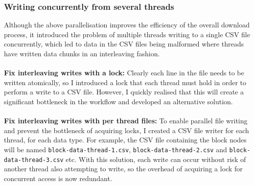 \subsubsection{Writing concurrently from several threads}
Although the above parallelisation improves the efficiency of the overall download process, it introduced the problem of multiple threads writing to a single CSV file concurrently, which led to data in the CSV files being malformed where threads have written data chunks in an interleaving fashion. 
\\\\
\textbf{Fix interleaving writes with a lock:} Clearly each line in the file needs to be written atomically, so I introduced a lock that each thread must hold in order to perform a write to a CSV file. However, I quickly realised that this will create a significant bottleneck in the workflow and developed an alternative solution.
\\\\
\textbf{Fix interleaving writes with per thread files:} To enable parallel file writing and prevent the bottleneck of acquiring locks, I created a CSV file writer for each thread, for each data type. For example, the CSV file containing the block nodes will be named \texttt{block-data-thread-1.csv}, \texttt{block-data-thread-2.csv} and \texttt{block-data-thread-3.csv} etc. With this solution, each write can occur without risk of another thread also attempting to write, so the overhead of acquiring a lock for concurrent access is now redundant. 

